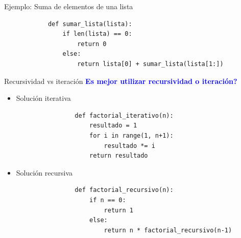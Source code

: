 \documentclass{beamer}
\begin{document}
    \begin{frame}[fragile, t]{Ejemplo: Suma de elementos de una lista}
        \begin{verbatim}
            def sumar_lista(lista):
                if len(lista) == 0:
                    return 0
                else:
                    return lista[0] + sumar_lista(lista[1:])
        \end{verbatim}
    \end{frame}

    \begin{frame}[fragile, t]{Recursividad vs iteración}
        \textcolor{blue}{\textbf{Es mejor utilizar recursividad o iteración?}}
        \begin{itemize}
            \item Solución iterativa
            \begin{verbatim}
                def factorial_iterativo(n):
                    resultado = 1
                    for i in range(1, n+1):
                        resultado *= i
                    return resultado
            \end{verbatim}
            \item Solución recursiva
            \begin{verbatim}
                def factorial_recursivo(n):
                    if n == 0:
                        return 1
                    else:
                        return n * factorial_recursivo(n-1)
            \end{verbatim}
        \end{itemize}
    \end{frame}
\end{document}
